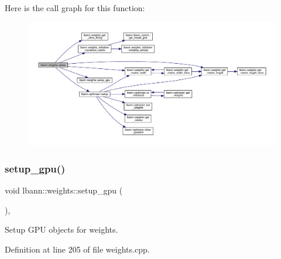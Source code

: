 Here is the call graph for this function\+:\nopagebreak
\begin{figure}[H]
\begin{center}
\leavevmode
\includegraphics[width=350pt]{classlbann_1_1weights_a32a8395709a5238ca93d4b4f102cdc12_cgraph}
\end{center}
\end{figure}
\mbox{\label{classlbann_1_1weights_a7137725a835a37ded1a5ad7f739224a7}} 
\subsubsection{\texorpdfstring{setup\+\_\+gpu()}{setup\_gpu()}}
{\footnotesize\ttfamily void lbann\+::weights\+::setup\+\_\+gpu (\begin{DoxyParamCaption}{ }\end{DoxyParamCaption})\hspace{0.3cm}{\ttfamily [private]}, {\ttfamily [virtual]}}

Setup G\+PU objects for weights. 

Definition at line 205 of file weights.\+cpp.


